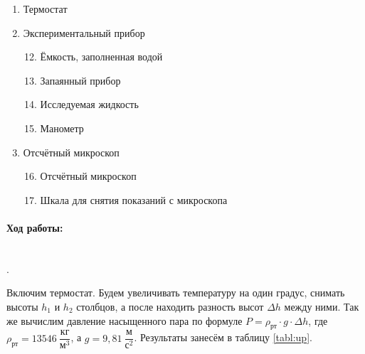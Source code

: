 \documentclass[a4paper, 12pt]{article}
\newcommand{\parag}[1]{\paragraph*{#1:}}
\newcounter{Points}
\newcommand{\point}{\arabic{Points}. \addtocounter{Points}{1}}
\begin{document}
\begin{enumerate}
    \item Термостат
    \item Экспериментальный прибор
    \begin{enumerate}
        \setcounter {enumii}{11}
        \item Ёмкость, заполненная водой
        \item Запаянный прибор
        \item Исследуемая жидкость
        \item Манометр
    \end{enumerate}
    \item Отсчётный микроскоп
    \begin{enumerate}
        \setcounter {enumii}{15}
        \item Отсчётный микроскоп
        \item Шкала для снятия показаний с микроскопа
    \end{enumerate}
\end{enumerate}

\parag {Ход работы} ~\\

\point Включим термостат. Будем увеличивать температуру на один градус, снимать высоты $h_1$ и $h_2$ столбцов, а после находить разность высот $\Delta h$ между ними. Так же вычислим давление насыщенного пара по формуле $P = \rho_{\text{рт}} \cdot g \cdot \Delta h$, где $\rho_{\text{рт}} = 13546 ~\dfrac{\text{кг}}{\text{м}^3}$, а $g = 9,81 ~\dfrac {\text{м}}{\text{с}^2}$. Результаты занесём в таблицу \ref{tabl:up}.
\end{document}

